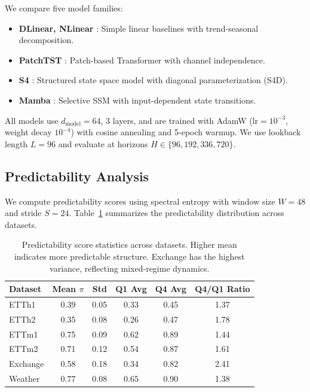 \documentclass[10pt]{article}
\newcommand{\predscore}{\pi}
\begin{document}
We compare five model families:
\begin{itemize}
    \item \textbf{DLinear, NLinear} \citep{zeng2023transformers}: Simple linear baselines with trend-seasonal decomposition.
    \item \textbf{PatchTST} \citep{nie2023patchtst}: Patch-based Transformer with channel independence.
    \item \textbf{S4} \citep{gu2022efficiently}: Structured state space model with diagonal parameterization (S4D).
    \item \textbf{Mamba} \citep{gu2023mamba}: Selective SSM with input-dependent state transitions.
\end{itemize}

All models use $d_{\text{model}}=64$, 3 layers, and are trained with AdamW ($\text{lr}=10^{-3}$, weight decay $10^{-4}$) with cosine annealing and 5-epoch warmup. We use lookback length $L=96$ and evaluate at horizons $H \in \{96, 192, 336, 720\}$.

\subsection{Predictability Analysis}

We compute predictability scores using spectral entropy with window size $W=48$ and stride $S=24$. Table~\ref{tab:pred_stats} summarizes the predictability distribution across datasets.

\begin{table}[t]
\caption{Predictability score statistics across datasets. Higher mean indicates more predictable structure. Exchange has the highest variance, reflecting mixed-regime dynamics.}
\label{tab:pred_stats}
\begin{center}
\begin{tabular}{lccccc}
\toprule
\textbf{Dataset} & \textbf{Mean} $\predscore$ & \textbf{Std} & \textbf{Q1 Avg} & \textbf{Q4 Avg} & \textbf{Q4/Q1 Ratio} \\
\midrule
ETTh1 & 0.39 & 0.05 & 0.33 & 0.45 & 1.37 \\
ETTh2 & 0.35 & 0.08 & 0.26 & 0.47 & 1.78 \\
ETTm1 & 0.75 & 0.09 & 0.62 & 0.89 & 1.44 \\
ETTm2 & 0.71 & 0.12 & 0.54 & 0.87 & 1.61 \\
Exchange & 0.58 & 0.18 & 0.34 & 0.82 & 2.41 \\
Weather & 0.77 & 0.08 & 0.65 & 0.90 & 1.38 \\
\bottomrule
\end{tabular}
\end{center}
\end{table}
\end{document}
